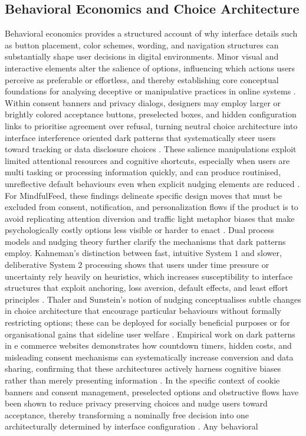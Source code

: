 \documentclass{article}
\begin{document}
\subsection{Behavioral Economics and Choice Architecture}
\label{sec:beh_econ_choice_arch} Behavioral economics provides a structured account of why interface details such as button placement, color schemes, wording, and navigation structures can substantially shape user decisions in digital environments. Minor visual and interactive elements alter the salience of options, influencing which actions users perceive as preferable or effortless, and thereby establishing core conceptual foundations for analysing deceptive or manipulative practices in online systems \parencites[2]{2668071}[12]{5678011}. Within consent banners and privacy dialogs, designers may employ larger or brightly colored acceptance buttons, preselected boxes, and hidden configuration links to prioritise agreement over refusal, turning neutral choice architecture into interface interference oriented dark patterns that systematically steer users toward tracking or data disclosure choices \parencites[12]{5678011}. These salience manipulations exploit limited attentional resources and cognitive shortcuts, especially when users are multi tasking or processing information quickly, and can produce routinised, unreflective default behaviours even when explicit nudging elements are reduced \parencites[12]{5678011}[14]{5678011}. For MindfulFeed, these findings delineate specific design moves that must be excluded from consent, notification, and personalization flows if the product is to avoid replicating attention diversion and traffic light metaphor biases that make psychologically costly options less visible or harder to enact \parencites[12]{5678011}. Dual process models and nudging theory further clarify the mechanisms that dark patterns employ. Kahneman's distinction between fast, intuitive $ \text{System 1} $ and slower, deliberative $ \text{System 2} $ processing shows that users under time pressure or uncertainty rely heavily on heuristics, which increases susceptibility to interface structures that exploit anchoring, loss aversion, default effects, and least effort principles \parencites[2]{2668071}[2]{4807303}. Thaler and Sunstein's notion of nudging conceptualises subtle changes in choice architecture that encourage particular behaviours without formally restricting options; these can be deployed for socially beneficial purposes or for organisational gains that sideline user welfare \parencites[2]{2668071}. Empirical work on dark patterns in e commerce websites demonstrates how countdown timers, hidden costs, and misleading consent mechanisms can systematically increase conversion and data sharing, confirming that these architectures actively harness cognitive biases rather than merely presenting information \parencites[2]{4807303}[2]{2668071}. In the specific context of cookie banners and consent management, preselected options and obstructive flows have been shown to reduce privacy preserving choices and nudge users toward acceptance, thereby transforming a nominally free decision into one architecturally determined by interface configuration \parencites[2]{4807303}[3]{5678011}. Any behavioral 
\end{document}
